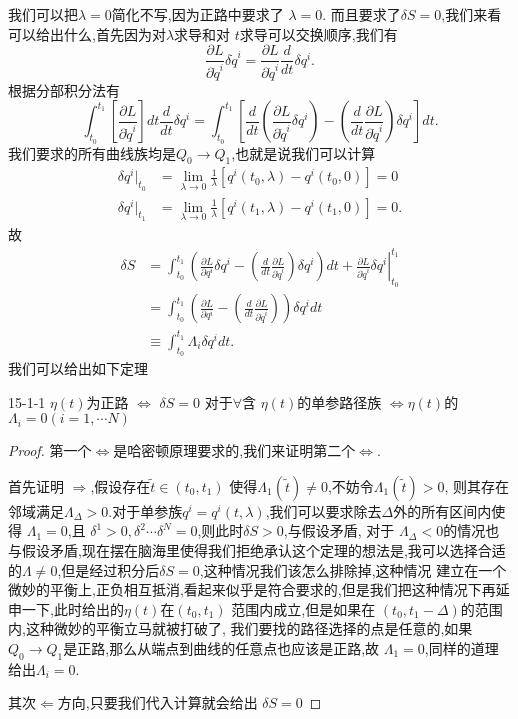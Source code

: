 \documentclass[../main.tex]{subfiles}
\begin{document}
我们可以把$\lambda = 0$简化不写,因为正路中要求了 $\lambda = 0$. 而且要求了$\delta S = 0$,我们来看可以给出什么,首先因为对$\lambda$求导和对 $t$求导可以交换顺序,我们有\[
\frac{\partial L}{\partial \dot{q}^i} \delta \dot{q}^i = \frac{\partial L}{\partial \dot{q}^i} \frac{d}{dt}\delta q^i
.\] 
根据分部积分法有\[
  \int^{t_1}_{t_0}[\frac{\partial L}{\partial \dot{q}^i}]dt \frac{d}{dt}\delta q^i = \int^{t_1}_{t_0}[\frac{d}{dt}(\frac{\partial L}{\partial \dot{q}^i} \delta q^i) - (\frac{d}{dt} \frac{\partial L}{\partial \dot{q}^i})\delta q^i]dt
.\] 
我们要求的所有曲线族均是$Q_0 \to Q_1$,也就是说我们可以计算
\begin{align*}
  \delta q^i |_{t_0} &= \lim_{\lambda \to 0} \frac{1}{\lambda}[q^i(t_0,\lambda) - q^i(t_0,0)] = 0 \\ 
  \delta q^i |_{t_1} &= \lim_{\lambda \to 0} \frac{1}{\lambda}[q^i(t_1,\lambda) - q^i(t_1,0)] = 0
.\end{align*}
故
\begin{align*}
  \delta S &=  \int^{t_1}_{t_0} \left( \frac{\partial L}{ \partial q^i}\delta q^i  - (\frac{d}{dt} \frac{\partial L}{\partial \dot{q}^i})\delta q^i \right) dt  + \left.\frac{\partial L}{\partial \dot{q}^i} \delta q^i\right|^{t_1}_{t_0}\\
           & = \int^{t_1}_{t_0} \left( \frac{\partial L}{ \partial q^i}  - (\frac{d}{dt} \frac{\partial L}{\partial \dot{q}^i}) \right) \delta q^i dt\\
           & \equiv \int^{t_1}_{t_0}\Lambda_i \delta q^i dt 
.\end{align*}
我们可以给出如下定理
\begin{theorem}
  {}{15-1-1}
 $\eta(t)$为正路 $\Longleftrightarrow$  $\delta S = 0$ 对于$\forall $含 $\eta(t)$的单参路径族  $\Longleftrightarrow \eta(t)$的$\Lambda_i = 0(i = 1,\cdots N)$ 
\end{theorem}
\begin{proof}
  第一个$\Longleftrightarrow$是哈密顿原理要求的,我们来证明第二个$\Longleftrightarrow$.

  首先证明 $\Rightarrow$,假设存在$\tilde{t} \in (t_0,t_1)$ 使得$\Lambda_1(\tilde{t}) \neq 0$,不妨令$\Lambda_1(\tilde{t}) > 0$,
  则其存在邻域满足$\Lambda_\Delta > 0$.对于单参族$q^i = q^i(t,\lambda)$,我们可以要求除去$\Delta$外的所有区间内使得 $\Lambda_1 = 0$,且 $\delta^1 > 0, \delta^2 \cdots \delta^N = 0$,则此时$\delta S > 0$,与假设矛盾,
  对于 $\Lambda_\Delta < 0$的情况也与假设矛盾,现在摆在脑海里使得我们拒绝承认这个定理的想法是,我可以选择合适的$\Lambda \neq 0$,但是经过积分后$\delta S = 0$,这种情况我们该怎么排除掉,这种情况
  建立在一个微妙的平衡上,正负相互抵消,看起来似乎是符合要求的,但是我们把这种情况下再延申一下,此时给出的$\eta(t)$在$(t_0,t_1)$ 范围内成立,但是如果在 $(t_0,t_1 -\Delta)$的范围内,这种微妙的平衡立马就被打破了,
  我们要找的路径选择的点是任意的,如果$Q_0 \to Q_1$是正路,那么从端点到曲线的任意点也应该是正路,故 $\Lambda_1 = 0$,同样的道理给出$\Lambda_i = 0$.

  其次$\Leftarrow$方向,只要我们代入计算就会给出 $\delta S = 0$
\end{proof}
\end{document}
